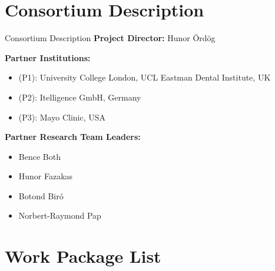 \documentclass{beamer}
\begin{document}
\section[Consortium Description]{Consortium Description}

\begin{frame}{Consortium Description}
  \textbf{Project Director:} Hunor Ördög
  
  \textbf{Partner Institutions:}
  \begin{itemize}
    \item (P1): University College London, UCL Eastman Dental Institute, UK
    \item (P2): Itelligence GmbH, Germany
    \item (P3): Mayo Clinic, USA
  \end{itemize}
  
  \textbf{Partner Research Team Leaders:}
  \begin{itemize}
    \item Bence Both
    \item Hunor Fazakas
    \item Botond Biró
    \item Norbert-Raymond Pap
  \end{itemize}
\end{frame}

\section[Work Package List]{Work Package List}
\end{document}
